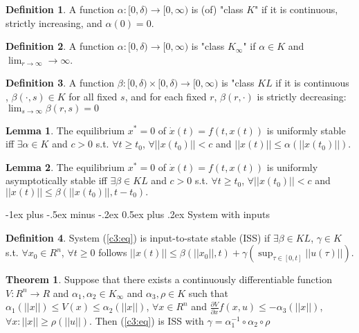 \documentclass[10pt,landscape]{article}
\makeatletter
\theoremstyle{definition}
\newtheorem{Theorem}{Theorem}[section]
\newtheorem{Lemma}{Lemma}
\newtheorem*{Definition}{Definition}
\renewcommand{\section}{\@startsection{section}{1}{0mm}%
                                {-1ex plus -.5ex minus -.2ex}%
                                {0.5ex plus .2ex}%
                                {\normalfont\large\bfseries}}
\makeatother
\begin{document}
\begin{multicols}{4}
\begin{Definition}
 A function $\alpha:[0,\delta)\to [0, \infty)$ is (of) "class $K$" if it is continuous,
 strictly increasing, and $\alpha(0)=0$.
\end{Definition}

\begin{Definition}
 A function $\alpha:[0,\delta)\to [0, \infty)$ is "class $K_\infty$" if $\alpha \in K$
 and $\lim_{r\to\infty} \to\infty$.
\end{Definition}

\begin{Definition}
 A function $\beta:[0,\delta)\times[0,\delta)\to [0, \infty)$ is "class $KL$ if it is continuous
 , $\beta(\cdot, s) \in K$ for all fixed $s$, and for each fixed $r$, $\beta(r, \cdot)$ is
 strictly decreasing: $\lim_{s\to\infty}\beta(r,s)=0$
\end{Definition}

\begin{Lemma}
 The equilibrium $x^*=0$ of $\dot x(t)=f(t,x(t))$ is uniformly stable iff
 $\exists \alpha\in K$ and $c>0$ s.t.  $\forall t \ge t_0$,
 $\forall ||x(t_0)||<c$ and $||x(t)|| \le \alpha(||x(t_0)||).$ 
\end{Lemma}

\begin{Lemma}
 The equilibrium $x^*=0$ of $\dot x(t)=f(t,x(t))$ is uniformly asymptotically stable iff
 $\exists \beta\in KL$ and $c>0$ s.t. $\forall t \ge t_0$,
 $\forall ||x(t_0)||<c$ and $||x(t)|| \le \beta(||x(t_0)||, t-t_0).$ 
\end{Lemma}

\section{System with inputs}

\begin{Definition}
 System (\ref{c3:eq}) is input-to-state stable (ISS) if $\exists \beta\in KL$,
 $\gamma\in K$ s.t. $\forall x_0\in R^n$, $\forall t \ge 0$ follows 
 $||x(t)||\le\beta(||x_0||, t)+\gamma(\sup_{\tau\in[0,t]} ||u(\tau)||)$.
\end{Definition}

\begin{Theorem}
 Suppose that there exists a continuously differentiable function 
 $V:R^n\to R$ and $\alpha_1,\alpha_2\in K_\infty$ and $\alpha_3, \rho \in K$
 such that $\alpha_1(||x||)\le V(x)\le\alpha_2(||x||)$, $\forall x\in R^n$ and
 $\frac{\partial V}{\partial x}f(x,u)\le-\alpha_3(||x||)$,
 $\forall x: ||x||\ge\rho(||u||)$. Then (\ref{c3:eq}) is ISS with 
 $\gamma = \alpha_1^{-1} \circ \alpha_2\circ\rho$
\end{Theorem}


\end{multicols}
\end{document}
